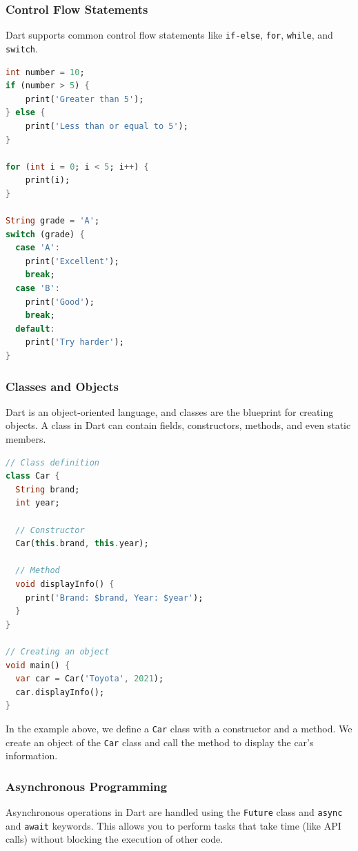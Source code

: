 \documentclass[12pt,a4paper]{report}
\begin{document}
\subsubsection{Control Flow Statements}
Dart supports common control flow statements like \texttt{if-else}, \texttt{for}, \texttt{while}, and \texttt{switch}.

\begin{lstlisting}[language=Dart, caption={Control Flow Statements in Dart}]
int number = 10;
if (number > 5) {
    print('Greater than 5');
} else {
    print('Less than or equal to 5');
}

for (int i = 0; i < 5; i++) {
    print(i);
}

String grade = 'A';
switch (grade) {
  case 'A':
    print('Excellent');
    break;
  case 'B':
    print('Good');
    break;
  default:
    print('Try harder');
}
\end{lstlisting}

\subsubsection{Classes and Objects}
Dart is an object-oriented language, and classes are the blueprint for creating objects. A class in Dart can contain fields, constructors, methods, and even static members.

\begin{lstlisting}[language=Dart, caption={Classes and Objects in Dart}]
// Class definition
class Car {
  String brand;
  int year;

  // Constructor
  Car(this.brand, this.year);

  // Method
  void displayInfo() {
    print('Brand: $brand, Year: $year');
  }
}

// Creating an object
void main() {
  var car = Car('Toyota', 2021);
  car.displayInfo();
}
\end{lstlisting}

In the example above, we define a \texttt{Car} class with a constructor and a method. We create an object of the \texttt{Car} class and call the method to display the car's information.

\subsubsection{Asynchronous Programming}
Asynchronous operations in Dart are handled using the \texttt{Future} class and \texttt{async} and \texttt{await} keywords. This allows you to perform tasks that take time (like API calls) without blocking the execution of other code.
\end{document}
